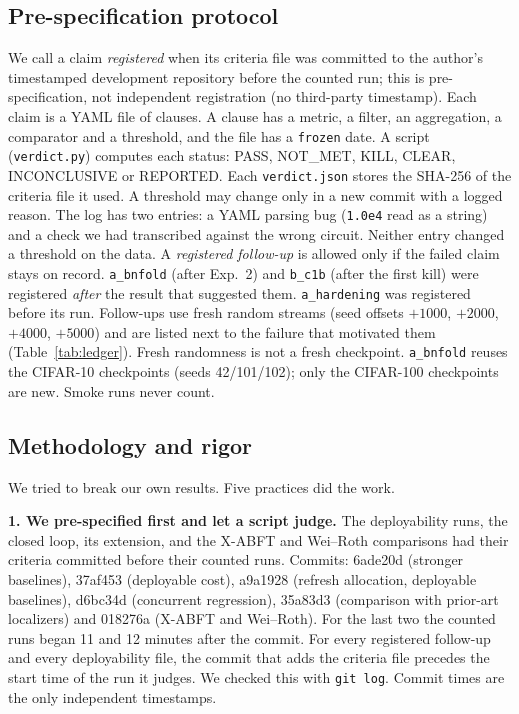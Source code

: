 \documentclass[journal]{IEEEtran}
\begin{document}
\subsection{Pre-specification protocol}
\label{sec:protocol}
We call a claim \emph{registered} when its criteria file was committed to the author's timestamped development repository before the counted run; this is pre-specification, not independent registration (no third-party timestamp). Each claim is a YAML file of clauses. A clause has a metric, a filter, an aggregation, a comparator and a threshold, and the file has a \texttt{frozen} date. A script (\texttt{verdict.py}) computes each status: PASS, NOT\_MET, KILL, CLEAR, INCONCLUSIVE or REPORTED. Each \texttt{verdict.json} stores the SHA-256 of the criteria file it used. A threshold may change only in a new commit with a logged reason. The log has two entries: a YAML parsing bug (\texttt{1.0e4} read as a string) and a check we had transcribed against the wrong circuit. Neither entry changed a threshold on the data.
A \emph{registered follow-up} is allowed only if the failed claim stays on record. \texttt{a\_bnfold} (after Exp.~2) and \texttt{b\_c1b} (after the first kill) were registered \emph{after} the result that suggested them. \texttt{a\_hardening} was registered before its run. Follow-ups use fresh random streams (seed offsets $+1000$, $+2000$, $+4000$, $+5000$) and are listed next to the failure that motivated them (Table~\ref{tab:ledger}).
Fresh randomness is not a fresh checkpoint. \texttt{a\_bnfold} reuses the CIFAR-10 checkpoints (seeds 42/101/102); only the CIFAR-100 checkpoints are new. Smoke runs never count.

\subsection{Methodology and rigor}
\label{sec:honest}
We tried to break our own results. Five practices did the work.

\textbf{1. We pre-specified first and let a script judge.} The deployability runs, the closed loop, its extension, and the X-ABFT and Wei--Roth comparisons had their criteria committed before their counted runs. Commits: 6ade20d (stronger baselines), 37af453 (deployable cost), a9a1928 (refresh allocation, deployable baselines), d6bc34d (concurrent regression), 35a83d3 (comparison with prior-art localizers) and 018276a (X-ABFT and Wei--Roth). For the last two the counted runs began 11 and 12 minutes after the commit.
For every registered follow-up and every deployability file, the commit that adds the criteria file precedes the start time of the run it judges. We checked this with \texttt{git log}. Commit times are the only independent timestamps.
\end{document}
